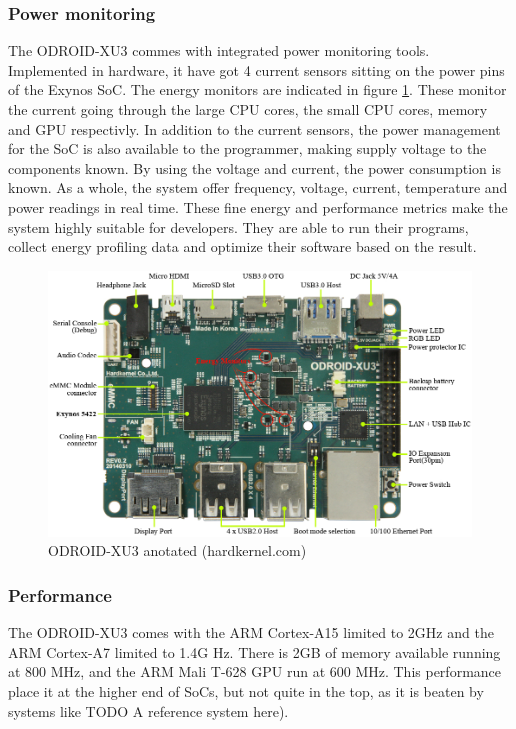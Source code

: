 \subsubsection{Power monitoring}
The ODROID-XU3 commes with integrated power monitoring tools.
Implemented in hardware, it have got 4 current sensors sitting on the power pins of the Exynos SoC.
The energy monitors are indicated in figure \ref{overview-odroid}.
These monitor the current going through the large CPU cores, the small CPU cores, memory and GPU respectivly.
In addition to the current sensors, the power management for the SoC is also available to the programmer, making supply voltage to the components known.
By using the voltage and current, the power consumption is known.
As a whole, the system offer frequency, voltage, current, temperature and power readings in real time.
These fine energy and performance metrics make the system highly suitable for developers.
They are able to run their programs, collect energy profiling data and optimize their software based on the result.

\begin{figure}[ht!]
  \centering
  \includegraphics[width=130mm]{fig/overview-odroid.jpg}
  \caption{ODROID-XU3 anotated (hardkernel.com\cite{hardkernel01})\label{overview-odroid}}
\end{figure}
\subsubsection{Performance}

The ODROID-XU3 comes with the ARM Cortex-A15 limited to 2GHz and the ARM Cortex-A7 limited to 1.4G Hz.
There is 2GB of memory available running at 800 MHz, and the ARM Mali T-628 GPU run at 600 MHz.
This performance place it at the higher end of SoCs, but not quite in the top, as it is beaten by systems like TODO A reference system here).




